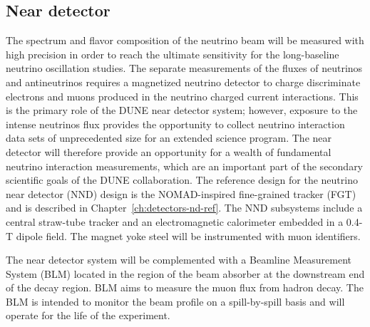 \subsection{Near detector}
\label{sec:intro-dune-near-det}

The spectrum and flavor composition of the neutrino beam will be
measured with high precision in order to reach the ultimate
sensitivity for the long-baseline neutrino oscillation studies.  The
separate measurements of the fluxes of neutrinos and antineutrinos requires a
magnetized neutrino detector to charge discriminate electrons and
muons produced in the neutrino charged current interactions.  This is
the primary role of the DUNE near detector system; however, exposure
to the intense neutrinos flux provides the opportunity to collect
neutrino interaction data sets of unprecedented size for an extended
science program.  The near detector will therefore provide an
opportunity for a wealth of fundamental neutrino interaction
measurements, which are an important part of the secondary scientific
goals of the DUNE collaboration.  The reference design for the
neutrino near detector (NND) design is the NOMAD-inspired fine-grained
tracker (FGT) and is described in
Chapter~\ref{ch:detectors-nd-ref}. The NND subsystems include a
central straw-tube tracker and an electromagnetic calorimeter embedded
in a 0.4-T dipole field. The magnet yoke steel will be instrumented
with muon identifiers.

The near detector system will be complemented with a Beamline
Measurement System (BLM) located in the region of the beam absorber at
the downstream end of the decay region. BLM aims to measure the muon
flux from hadron decay.  The BLM is intended to monitor the beam
profile on a spill-by-spill basis and will operate for the life of
the experiment.
